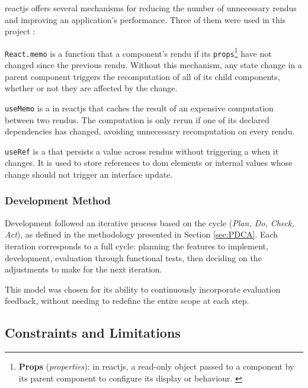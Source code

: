 \clearpage


 \label{sec:optim_react}

\gls{reactjs} offers several mechanisms for reducing the number of unnecessary \glspl{rendu} and improving an application's performance. Three of them were used in this project \parencite{noauthor_reference_nodate}:

\texttt{React.memo} is a function that  a component's \gls{rendu} if its \texttt{props}\footnote{\textbf{Props} (\textit{properties}): in \gls{reactjs}, a read-only object passed to a component by its parent component to configure its display or behaviour. \parencite{noauthor_reference_nodate}} have not changed since the previous \gls{rendu}. Without this mechanism, any state change in a parent component triggers the recomputation of all of its child components, whether or not they are affected by the change.

\texttt{useMemo} is a  in \gls{reactjs} that caches the result of an expensive computation between two \glspl{rendu}. The computation is only rerun if one of its declared dependencies has changed, avoiding unnecessary recomputation on every \gls{rendu}.

\texttt{useRef} is a  that persists a value across \glspl{rendu} without triggering a  when it changes. It is used to store references to \acrshort{dom} elements or internal values whose change should not trigger an interface update.


\subsubsection{Development Method}

Development followed an iterative process based on the  cycle (\textit{Plan, Do, Check, Act}), as defined in the methodology presented in Section \ref{sec:PDCA}. Each iteration corresponds to a full cycle: planning the features to implement, development, evaluation through functional tests, then deciding on the adjustments to make for the next iteration.

This model was chosen for its ability to continuously incorporate evaluation feedback, without needing to redefine the entire scope at each step.

\clearpage


\subsection{Constraints and Limitations}

